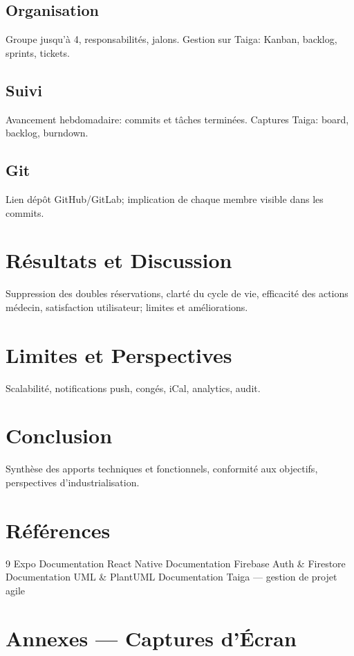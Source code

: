 \documentclass[12pt,a4paper]{report}
\begin{document}
\section{Organisation}
Groupe jusqu’à 4, responsabilités, jalons. Gestion sur Taiga: Kanban, backlog, sprints, tickets.
\section{Suivi}
Avancement hebdomadaire: commits et tâches terminées. Captures Taiga: board, backlog, burndown.
\section{Git}
Lien dépôt GitHub/GitLab; implication de chaque membre visible dans les commits.
\chapter{Résultats et Discussion}
Suppression des doubles réservations, clarté du cycle de vie, efficacité des actions médecin, satisfaction utilisateur; limites et améliorations.
\chapter{Limites et Perspectives}
Scalabilité, notifications push, congés, iCal, analytics, audit.
\chapter{Conclusion}
Synthèse des apports techniques et fonctionnels, conformité aux objectifs, perspectives d’industrialisation.
\chapter*{Références}
\begin{thebibliography}{9}
 Expo Documentation
 React Native Documentation
 Firebase Auth \& Firestore Documentation
 UML \& PlantUML Documentation
 Taiga — gestion de projet agile
\end{thebibliography}
\appendix
\chapter{Annexes — Captures d’Écran}
\end{document}
